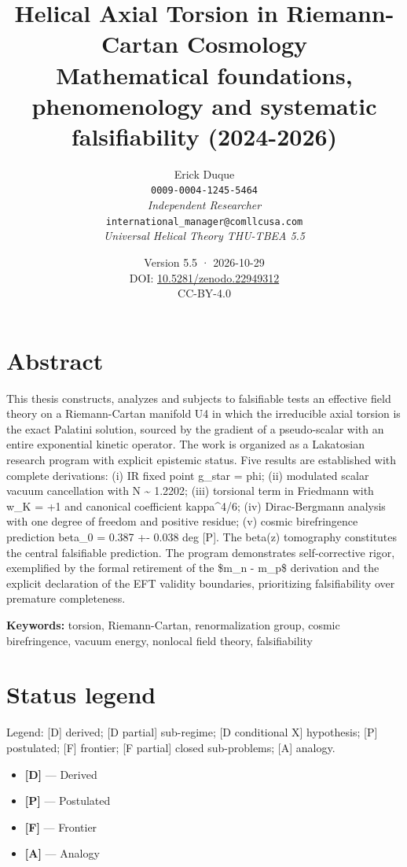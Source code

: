 ﻿\documentclass[11pt,letterpaper]{article}
\title{\textbf{Helical Axial Torsion in Riemann-Cartan Cosmology} \\[0.5em] \large Mathematical foundations, phenomenology and systematic falsifiability (2024-2026)}
\author{Erick Duque \\ \texttt{0009-0004-1245-5464} \\ \textit{Independent Researcher} \\ \texttt{international\_manager@comllcusa.com} \\ \textit{Universal Helical Theory THU-TBEA 5.5}}
\date{Version 5.5 · 2026-10-29 \\ \small DOI: \href{https://doi.org/10.5281/zenodo.22949312}{10.5281/zenodo.22949312} \\ \small CC-BY-4.0}
\begin{document}
\maketitle
\thispagestyle{empty}

\section*{Abstract}

This thesis constructs, analyzes and subjects to falsifiable tests an effective field theory on a Riemann-Cartan manifold U4 in which the irreducible axial torsion is the exact Palatini solution, sourced by the gradient of a pseudo-scalar with an entire exponential kinetic operator. The work is organized as a Lakatosian research program with explicit epistemic status. Five results are established with complete derivations: (i) IR fixed point g\_star = phi; (ii) modulated scalar vacuum cancellation with N \textasciitilde{} 1.2202; (iii) torsional term in Friedmann with w\_K = +1 and canonical coefficient kappa\textasciicircum{}4/6; (iv) Dirac-Bergmann analysis with one degree of freedom and positive residue; (v) cosmic birefringence prediction beta\_0 = 0.387 +- 0.038 deg [P]. The beta(z) tomography constitutes the central falsifiable prediction. The program demonstrates self-corrective rigor, exemplified by the formal retirement of the \$m\_n - m\_p\$ derivation and the explicit declaration of the EFT validity boundaries, prioritizing falsifiability over premature completeness.

\vspace{1em}
\textbf{Keywords:} torsion, Riemann-Cartan, renormalization group, cosmic birefringence, vacuum energy, nonlocal field theory, falsifiability

\newpage
\tableofcontents
\newpage

\section*{Status legend}
Legend: [D] derived; [D partial] sub-regime; [D conditional X] hypothesis; [P] postulated; [F] frontier; [F partial] closed sub-problems; [A] analogy.

\vspace{0.5em}
\begin{itemize}[leftmargin=*]
\item \textcolor{Dgreen}{\textbf{[D]}} — Derived
\item \textcolor{Ppurple}{\textbf{[P]}} — Postulated
\item \textcolor{Forange}{\textbf{[F]}} — Frontier
\item \textcolor{Ayellow}{\textbf{[A]}} — Analogy
\end{itemize}
\end{document}
